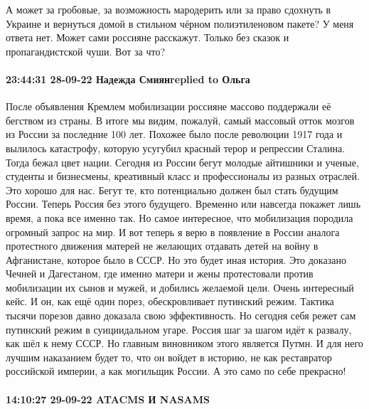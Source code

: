 А может за гробовые, за возможность мародерить или за право сдохнуть в Украине
и вернуться домой в стильном чёрном полиэтиленовом пакете? У меня ответа нет.
Может сами россияне расскажут. Только без сказок и пропагандистской чуши. Вот
за что?


\paragraph{23:44:31 28-09-22 Надежда Смиянreplied to Ольга}
После объявления Кремлем мобилизации россияне массово поддержали её бегством из страны. В итоге мы видим, пожалуй, самый массовый отток мозгов из России за последние 100 лет. Похожее было после революции 1917 года и вылилось катастрофу, которую усугубил красный терор и репрессии Сталина. Тогда бежал цвет нации.
Сегодня из России бегут молодые айтишники и ученые, студенты и бизнесмены, креативный класс и профессионалы из разных отраслей. Это хорошо для нас. Бегут те, кто потенциально должен был стать будущим России. Теперь Россия без этого будущего. Временно или навсегда покажет лишь время, а пока все именно так.
Но самое интересное, что мобилизация породила огромный запрос на мир. И вот теперь я верю в появление в России аналога протестного движения матерей не желающих отдавать детей на войну в Афганистане, которое было в СССР. Но это будет иная история. Это доказано Чечней и Дагестаном, где именно матери и жены протестовали против мобилизации их сынов и мужей, и добились желаемой цели. Очень интересный кейс. И он, как ещё один порез, обескровливает путинский режим. Тактика тысячи порезов давно доказала свою эффективность. Но сегодня себя режет сам путинский режим в суициидальном угаре.
Россия шаг за шагом идёт к развалу, как шёл к нему СССР. Но главным виновником этого является Путмн. И для него лучшим наказанием будет то, что он войдет в историю, не как реставратор российской империи, а как могильщик России. А это само по себе прекрасно!


\paragraph{14:10:27 29-09-22 ATACMS И NASAMS}

